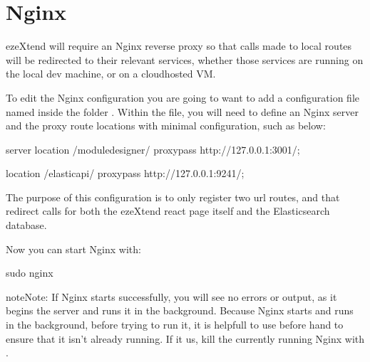 \documentclass[letterpaper,10pt,english]{sphinxmanual}
\begin{document}
\section{Nginx}
\label{\detokenize{setup:nginx}}
\sphinxAtStartPar
ezeXtend will require an Nginx reverse proxy so that calls made to local routes will be redirected to their relevant services, whether those services are running on the local dev machine, or on a cloud\sphinxhyphen{}hosted VM.

\sphinxAtStartPar
To edit the Nginx configuration you are going to want to add a configuration file named   inside the folder . Within the file, you will need to define an Nginx server and the proxy route locations with minimal configuration, such as below:

\begin{sphinxVerbatim}[commandchars=\\\{\}]
server \PYGZob{}
   location /module\PYGZus{}designer/ \PYGZob{}
      proxy\PYGZus{}pass http://127.0.0.1:3001/;
   \PYGZcb{}

   location /elastic\PYGZus{}api/ \PYGZob{}
      proxy\PYGZus{}pass http://127.0.0.1:9241/;
   \PYGZcb{}
\PYGZcb{}
\end{sphinxVerbatim}

\sphinxAtStartPar
The purpose of this configuration is to only register two url routes,  and  that redirect calls for both the ezeXtend react page itself and the Elasticsearch database.

\sphinxAtStartPar
Now you can start Nginx with:

\begin{sphinxVerbatim}[commandchars=\\\{\}]
sudo nginx
\end{sphinxVerbatim}

\begin{sphinxadmonition}{note}{Note:}
\sphinxAtStartPar
If Nginx starts successfully, you will see no errors or output, as it begins the server and runs it in the background. Because Nginx starts and runs in the background, before trying to run it, it is helpfull to use  before hand to ensure that it isn’t already running. If it us, kill the currently running Nginx with .
\end{sphinxadmonition}
\end{document}
